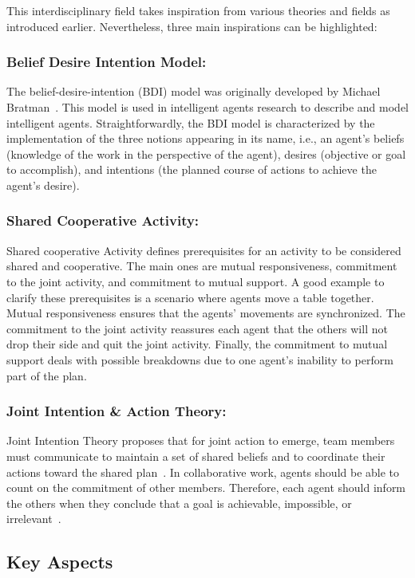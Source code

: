 This interdisciplinary field takes inspiration from various theories and fields as introduced earlier. Nevertheless, three main inspirations can be highlighted:

\subsubsection*{Belief Desire Intention Model:} The belief-desire-intention (BDI) model was originally developed by Michael Bratman~\cite{Bratman1987_BRAIPA}. This model is used in intelligent agents research to describe and model intelligent agents. Straightforwardly, the BDI model is characterized by the implementation of the three notions appearing in its name, i.e., an agent's beliefs (knowledge of the work in the perspective of the agent), desires (objective or goal to accomplish), and intentions (the planned course of actions to achieve the agent's desire). 

\subsubsection*{Shared Cooperative Activity:} Shared cooperative Activity defines prerequisites for an activity to be considered shared and cooperative. The main ones are mutual responsiveness, commitment to the joint activity, and commitment to mutual support. A good example to clarify these prerequisites is a scenario where agents move a table together. Mutual responsiveness ensures that the agents' movements are synchronized. The commitment to the joint activity reassures each agent that the others will not drop their side and quit the joint activity. Finally, the commitment to mutual support deals with possible breakdowns due to one agent's inability to perform part of the plan.  

\subsubsection*{Joint Intention \& Action Theory:} 
Joint Intention Theory proposes that for joint action to emerge, team members must communicate to maintain a set of shared beliefs and to coordinate their actions toward the shared plan~\cite{cohen_teamwork_1991}. In collaborative work, agents should be able to count on the commitment of other members. Therefore, each agent should inform the others when they conclude that a goal is achievable, impossible, or irrelevant~\cite{hoffman2004collaboration}.

\subsection{Key Aspects}

